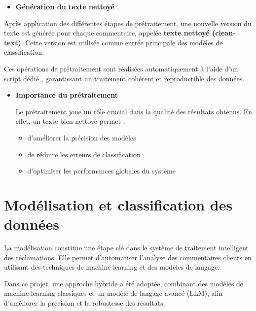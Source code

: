 \documentclass[12pt,a4paper,oneside]{report}
\begin{document}
\begin{itemize}
    \item \textbf{Génération du texte nettoyé}
\end{itemize}

Après application des différentes étapes de prétraitement, une nouvelle version du texte est générée pour chaque commentaire, appelée \textbf{texte nettoyé (clean-text)}. Cette version est utilisée comme entrée principale des modèles de classification.

Ces opérations de prétraitement sont réalisées automatiquement à l’aide d’un script dédié , garantissant un traitement cohérent et reproductible des données.

\begin{itemize}
    \item \textbf{Importance du prétraitement}

Le prétraitement joue un rôle crucial dans la qualité des résultats obtenus. En effet, un texte bien nettoyé permet :

\begin{itemize}
    \item d’améliorer la précision des modèles
    \item de réduire les erreurs de classification
    \item d’optimiser les performances globales du système
\end{itemize}
\end{itemize}
\section{Modélisation et classification des données}
La modélisation constitue une étape clé dans le système de traitement intelligent des réclamations. Elle permet d’automatiser l’analyse des commentaires clients en utilisant des techniques de machine learning et des modèles de langage.

Dans ce projet, une approche hybride a été adoptée, combinant des modèles de machine learning classiques et un modèle de langage avancé (LLM), afin d’améliorer la précision et la robustesse des résultats.
\end{document}
